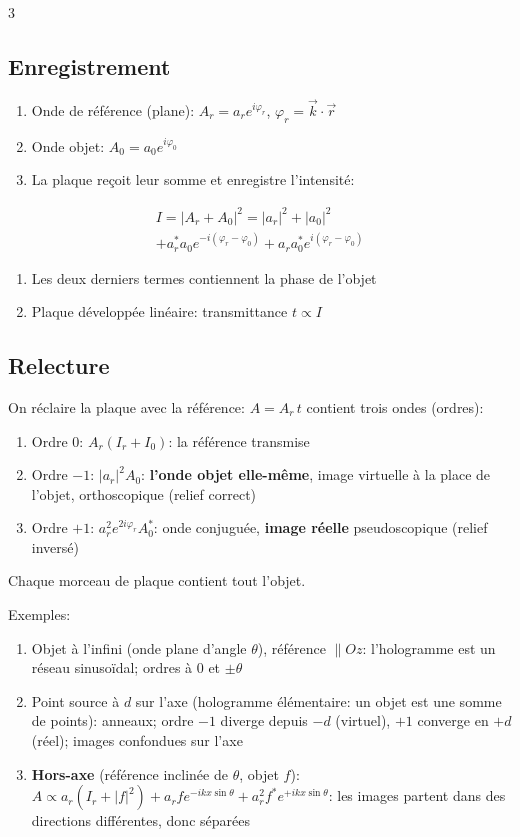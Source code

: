 \documentclass[12pt, a4paper]{article}
\newcommand{\ve}[1]{\vec{#1}}
\begin{document}
\begin{multicols*}{3}
	\subsection{Enregistrement}
	\begin{enumerate}[\roman*.]
		\item Onde de référence (plane): $A_r=a_re^{i\varphi_r}$, $\varphi_r=\ve k\cdot\ve r$
		\item Onde objet: $A_0=a_0e^{i\varphi_0}$
		\item La plaque reçoit leur somme et enregistre l'intensité:
	\end{enumerate}
	\begin{gather*}
		I=|A_r+A_0|^2=|a_r|^2+|a_0|^2\\
		+a_r^*a_0e^{-i(\varphi_r-\varphi_0)}+a_ra_0^*e^{i(\varphi_r-\varphi_0)}
	\end{gather*}
	\begin{enumerate}[\roman*.]
		\item Les deux derniers termes contiennent la phase de l'objet
		\item Plaque développée linéaire: transmittance $t\propto I$
	\end{enumerate}

	\subsection{Relecture}
	On réclaire la plaque avec la référence: $A=A_r\,t$ contient trois ondes (ordres):
	\begin{enumerate}[\roman*.]
		\item Ordre 0: $A_r(I_r+I_0)$: la référence transmise
		\item Ordre $-1$: $|a_r|^2A_0$: \textbf{l'onde objet elle-même}, image virtuelle à la place de l'objet, orthoscopique (relief correct)
		\item Ordre $+1$: $a_r^2e^{2i\varphi_r}A_0^*$: onde conjuguée, \textbf{image réelle} pseudoscopique (relief inversé)
	\end{enumerate}
	Chaque morceau de plaque contient tout l'objet.

	\colbreak
	Exemples:
	\begin{enumerate}[\roman*.]
		\item Objet à l'infini (onde plane d'angle $\theta$), référence $\parallel Oz$: l'hologramme est un réseau sinusoïdal; ordres à $0$ et $\pm\theta$
		\item Point source à $d$ sur l'axe (hologramme élémentaire: un objet est une somme de points): anneaux; ordre $-1$ diverge depuis $-d$ (virtuel), $+1$ converge en $+d$ (réel); images confondues sur l'axe
		\item \textbf{Hors-axe} (référence inclinée de $\theta$, objet $f$): $A\propto a_r(I_r+|f|^2)+a_rfe^{-ikx\sin\theta}+a_r^2f^*e^{+ikx\sin\theta}$: les images partent dans des directions différentes, donc séparées
	\end{enumerate}


\end{multicols*}
\end{document}
